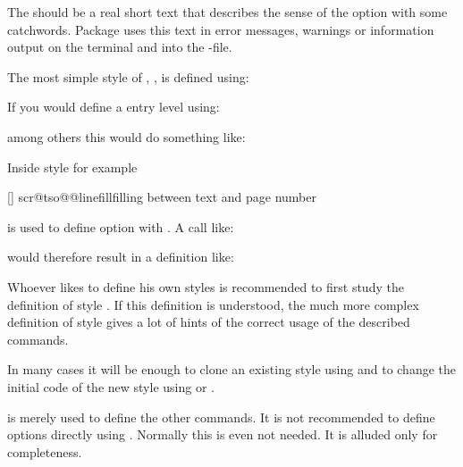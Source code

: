 The  should be a real short text that describes the sense
of the option with some catchwords. Package  uses this text
in error messages, warnings or information output on the terminal and into the
-file.

The most simple style of , , is defined
using:
\begin{lstcode}[belowskip=\dp\strutbox plus 1pt]
\end{lstcode}
If you would define a entry level  using:
\begin{lstcode}[belowskip=\dp\strutbox plus 1pt]
\end{lstcode}
among others this would do something like:
\begin{lstcode}[belowskip=\dp\strutbox plus 1pt]
  \def\dummytocdepth{1}
  \def\l@dummy#1#2{}
\end{lstcode}

Inside style  for example
\begin{lstcode}[belowskip=\dp\strutbox plus 1pt]
  [\TOCLineLeaderFill]%
  {scr@tso@}{@linefill}{filling between text and page number}%
\end{lstcode}
is used to define option  with 
. A call like:
\begin{lstcode}[belowskip=\dp\strutbox plus 1pt]
\end{lstcode}
would therefore result in a definition like:
\begin{lstcode}[belowskip=\dp\strutbox plus 1pt]
  \def\scr@tso@part@linefill{\TOCLineLeaderFill}
\end{lstcode}

Whoever likes to define his own styles is recommended to first study the
definition of style . If this definition is understood,
the much more complex definition of style  gives a lot of
hints of the correct usage of the described commands.

In many cases it will be enough to clone an existing style using
 and to change the initial code of the new style
using  or .

 is merely used to define the other
commands. It is not recommended to define options directly using
. Normally this is even not needed. It is
alluded only for completeness.%
%
%
%
%
%
%
%

